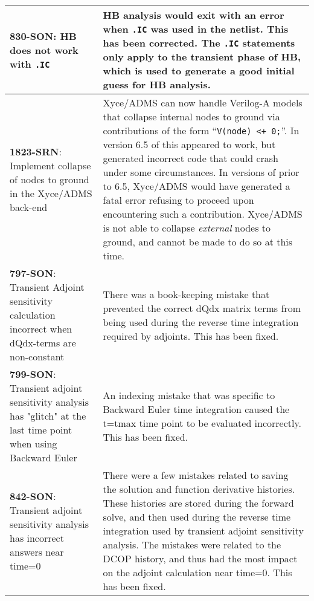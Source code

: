 {\begin{longtable}[h] {>{\raggedright\small}m{2in}|>{\raggedright\let\\\tabularnewline\small}m{3.5in}}
     \textbf{830-SON}: HB does not work with \texttt{.IC} & HB analysis would exit with an error when \texttt{.IC} was used in the netlist. This has been corrected. The \texttt{.IC} statements only apply to the transient phase of HB, which is used to generate a good initial guess for HB analysis.  \\ \hline

     \textbf{1823-SRN}: Implement collapse of nodes to ground in the Xyce/ADMS back-end & Xyce/ADMS can now handle Verilog-A models that collapse internal nodes to ground via contributions of the form ``\texttt{V(node) <+ 0;}''.  In version 6.5 of \Xyce{} this appeared to work, but generated incorrect code that could crash \Xyce{} under some circumstances.  In versions of \Xyce{} prior to 6.5, Xyce/ADMS would have generated a fatal error refusing to proceed upon encountering such a contribution.  Xyce/ADMS is not able to collapse {\em external} nodes to ground, and cannot be made to do so at this time.  \\ \hline

     \textbf{797-SON}: Transient Adjoint sensitivity calculation incorrect when dQdx-terms are non-constant & There was a book-keeping mistake that prevented the correct dQdx matrix terms from being used during the reverse time integration required by adjoints.  This has been fixed.
     \\ \hline
     \textbf{799-SON}: Transient adjoint sensitivity analysis has "glitch" at the last time point when using Backward Euler &  An indexing mistake that was specific to Backward Euler time integration caused the t=tmax time point to be evaluated incorrectly.  This has been fixed.
     \\ \hline
     \textbf{842-SON}: Transient adjoint sensitivity analysis has incorrect answers near time=0 & There were a few mistakes related to saving the solution and function derivative histories.  These histories are stored during the forward solve, and then used during the reverse time integration used by transient adjoint sensitivity analysis.  The mistakes were related to the DCOP history, and thus had the most impact on the adjoint calculation near time=0.  This has been fixed.
     \\ \hline

\end{longtable}
}
